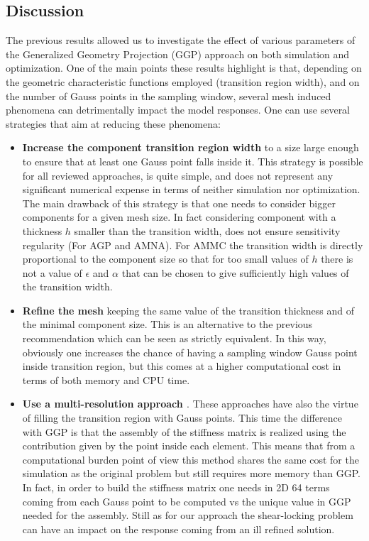 \subsection{Discussion}
\label{D}
The previous results allowed us to investigate the effect of various parameters of the Generalized Geometry Projection (GGP) approach on both simulation and optimization. One of the main points these results highlight is that, depending on the geometric characteristic functions employed (transition region width), and on the number of Gauss points in the sampling window, several mesh induced phenomena can detrimentally impact the model responses. One can use several strategies that aim at reducing these phenomena:
\begin{itemize}
\item \textbf{Increase the component transition region width} to a size large enough to ensure that at least one Gauss point falls inside it. This strategy is possible for all reviewed approaches, is quite simple, and does not represent any significant numerical expense in terms of neither simulation nor optimization. The main drawback of this strategy is that one needs to consider bigger components for a given mesh size. In fact considering component with a thickness $h$ smaller than the transition width, does not ensure sensitivity regularity (For AGP and AMNA). For AMMC the transition width is directly proportional to the component size so that for too small values of $h$ there is not a value of $\epsilon$ and $\alpha$ that can be chosen to give sufficiently high values of the transition width.
\item \textbf{Refine the mesh} keeping the same value of the transition thickness and of the minimal component size. This is an alternative to the previous recommendation which can be seen as strictly equivalent. In this way, obviously one increases the chance of having a sampling window Gauss point inside transition region, but this comes at a higher computational cost in terms of both memory and CPU time.
\item \textbf{Use a multi-resolution approach \cite{liu2018efficient}}. These approaches have also the virtue of filling the transition region with Gauss points. This time the difference with GGP is that the assembly of the stiffness matrix is realized using the contribution given by the point inside each element. This means that from a computational burden point of view this method shares the same cost for the simulation as the original problem but still requires more memory than GGP. In fact, in order to build the stiffness matrix one needs in 2D 64 terms coming from each Gauss point to be computed vs the unique value in GGP needed for the assembly. Still as for our approach the shear-locking problem can have an impact on the response coming from an ill refined solution.

\end{itemize}
